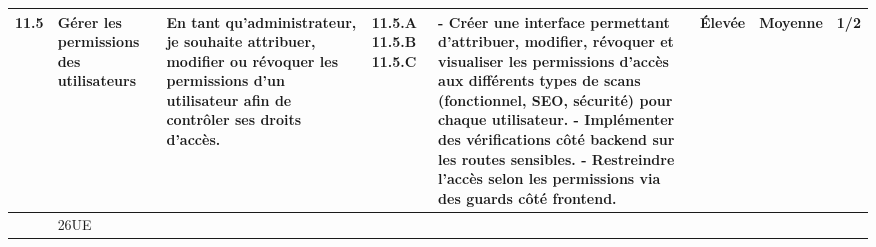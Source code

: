 \begin{landscape}
\begin{spacing}{0.94}
\begin{longtable}{|p{0.7cm}|p{2.4cm}|p{6cm}|p{1cm}|p{7.2cm}|p{0.2cm}|p{0.2cm}|p{2cm}|}
            11.5 & Gérer les permissions des utilisateurs
            & En tant qu’administrateur, je souhaite attribuer, modifier ou révoquer les permissions d’un utilisateur afin de contrôler ses droits d’accès.
            & 11.5.A 
            \newline\vspace{1.9cm} 11.5.B
             \newline\vspace{0.5cm} 11.5.C
            & - Créer une interface permettant d’attribuer, modifier, révoquer et visualiser les permissions d’accès aux différents types de scans (fonctionnel, SEO, sécurité) pour chaque utilisateur.\newline
            - Implémenter des vérifications côté backend sur les routes sensibles.\newline
            - Restreindre l’accès selon les permissions via des guards côté frontend.
            & Élevée & Moyenne & 1/2 \\\hline

            \rowcolor{gray!20}
			\multicolumn{7}{|c|}{TOTAL} &  26UE \\
            \hline 
        \end{longtable}
    \end{spacing}
    \vspace{-0.1cm}
\end{landscape}